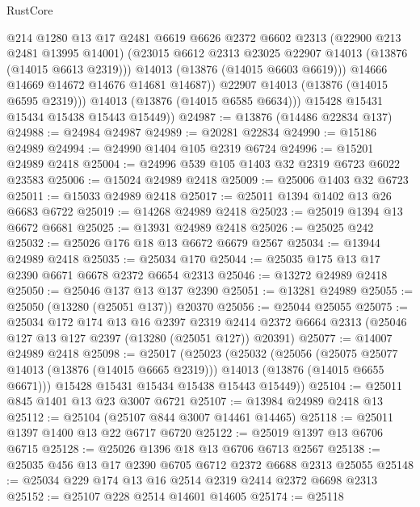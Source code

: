 \begin{lexlean}{RustCore}
\begin{coremodule}
                  @214
                  @1280
                  @13
                  @17
                  @2481
                  @6619
                  @6626
                  @2372
                  @6602
                  @2313
                  (@22900 @213 @2481 @13995 @14001)
                  (@23015 @6612 @2313 @23025 @22907 @14013 (@13876 (@14015 @6613 @2319)))
                  @14013
                  (@13876 (@14015 @6603 @6619)))
                @14666
                @14669
                @14672
                @14676
                @14681
                @14687))
            @22907
            @14013
            (@13876 (@14015 @6595 @2319)))
          @14013
          (@13876 (@14015 @6585 @6634)))
        @15428
        @15431
        @15434
        @15438
        @15443
        @15449))
@24987 := @13876 (@14486 @22834 @137)
@24988 := @24984 @24987
@24989 := @20281 @22834
@24990 := @15186 @24989
@24994 := @24990 @1404 @105 @2319 @6724
@24996 := @15201 @24989 @2418
@25004 := @24996 @539 @105 @1403 @32 @2319 @6723 @6022 @23583
@25006 := @15024 @24989 @2418
@25009 := @25006 @1403 @32 @6723
@25011 := @15033 @24989 @2418
@25017 := @25011 @1394 @1402 @13 @26 @6683 @6722
@25019 := @14268 @24989 @2418
@25023 := @25019 @1394 @13 @6672 @6681
@25025 := @13931 @24989 @2418
@25026 := @25025 @242
@25032 := @25026 @176 @18 @13 @6672 @6679 @2567
@25034 := @13944 @24989 @2418
@25035 := @25034 @170
@25044 := @25035 @175 @13 @17 @2390 @6671 @6678 @2372 @6654 @2313
@25046 := @13272 @24989 @2418
@25050 := @25046 @137 @13 @137 @2390
@25051 := @13281 @24989
@25055 := @25050 (@13280 (@25051 @137)) @20370
@25056 := @25044 @25055
@25075 := @25034
    @172
    @174
    @13
    @16
    @2397
    @2319
    @2414
    @2372
    @6664
    @2313
    (@25046 @127 @13 @127 @2397 (@13280 (@25051 @127)) @20391)
@25077 := @14007 @24989 @2418
@25098 := @25017
    (@25023
      (@25032
        (@25056
          (@25075 @25077 @14013 (@13876 (@14015 @6665 @2319)))
          @14013
          (@13876 (@14015 @6655 @6671)))
        @15428
        @15431
        @15434
        @15438
        @15443
        @15449))
@25104 := @25011 @845 @1401 @13 @23 @3007 @6721
@25107 := @13984 @24989 @2418 @13
@25112 := @25104 (@25107 @844 @3007 @14461 @14465)
@25118 := @25011 @1397 @1400 @13 @22 @6717 @6720
@25122 := @25019 @1397 @13 @6706 @6715
@25128 := @25026 @1396 @18 @13 @6706 @6713 @2567
@25138 := @25035 @456 @13 @17 @2390 @6705 @6712 @2372 @6688 @2313 @25055
@25148 := @25034 @229 @174 @13 @16 @2514 @2319 @2414 @2372 @6698 @2313
@25152 := @25107 @228 @2514 @14601 @14605
@25174 := @25118

\end{coremodule}
\end{lexlean}
